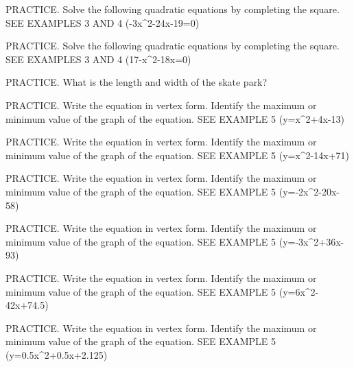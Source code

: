 \documentclass{article}
\newenvironment{practice}[2]{}{}        %
\newcommand{\answer}[1]{}               %
\newcommand{\placeholder}[2]{}          %
\begin{document}
\begin{practice}{40}{1}
PRACTICE. Solve the following quadratic equations by completing the square. SEE EXAMPLES 3 AND 4
(-3x^2-24x-19=0)
\answer{(-4\pm\sqrt{\frac{29}{3}})}
\end{practice}
\begin{practice}{41}{1}
PRACTICE. Solve the following quadratic equations by completing the square. SEE EXAMPLES 3 AND 4
(17-x^2-18x=0)
\answer{(-9\pm7\sqrt{2})}
\end{practice}
\begin{practice}{42}{2}
PRACTICE. What is the length and width of the skate park?
\placeholder{illustration}{Rectangular skate park in perspective with yellow ramps, rails, and several skaters. Callout 1,029.1 square feet area; boundary marked with black directional arrows and labeled 141.4 ft perimeter.}
\answer{50.2 ft and 20.5 ft}
\end{practice}
\begin{practice}{43}{1}
PRACTICE. Write the equation in vertex form. Identify the maximum or minimum value of the graph of the equation. SEE EXAMPLE 5
(y=x^2+4x-13)
\answer{(y=(x+2)^2-17); minimum (= -17)}
\end{practice}
\begin{practice}{44}{1}
PRACTICE. Write the equation in vertex form. Identify the maximum or minimum value of the graph of the equation. SEE EXAMPLE 5
(y=x^2-14x+71)
\answer{(y=(x-7)^2+22); minimum (=22)}
\end{practice}
\begin{practice}{45}{1}
PRACTICE. Write the equation in vertex form. Identify the maximum or minimum value of the graph of the equation. SEE EXAMPLE 5
(y=-2x^2-20x-58)
\answer{(y=-2(x+5)^2-8); maximum (=-8)}
\end{practice}
\begin{practice}{46}{1}
PRACTICE. Write the equation in vertex form. Identify the maximum or minimum value of the graph of the equation. SEE EXAMPLE 5
(y=-3x^2+36x-93)
\answer{(y=-3(x-6)^2+15); maximum (=15)}
\end{practice}
\begin{practice}{47}{1}
PRACTICE. Write the equation in vertex form. Identify the maximum or minimum value of the graph of the equation. SEE EXAMPLE 5
(y=6x^2-42x+74.5)
\answer{(y=6(x-3.5)^2+1); minimum (=1)}
\end{practice}
\begin{practice}{48}{1}
PRACTICE. Write the equation in vertex form. Identify the maximum or minimum value of the graph of the equation. SEE EXAMPLE 5
(y=0.5x^2+0.5x+2.125)
\answer{(y=0.5(x+0.5)^2+2); minimum (=2)}
\end{practice}
\end{document}
